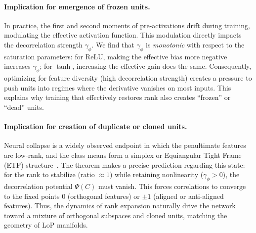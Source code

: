 \documentclass{article}
\newtheorem{theorem}{Theorem}[section]
\numberwithin{figure}{section}
\begin{document}
\paragraph{Implication for emergence of frozen units.}
In practice, the first and second moments of pre-activations drift during training, modulating the effective activation function. This modulation directly impacts the decorrelation strength $\gamma_\phi$. We find that $\gamma_\phi$ is \emph{monotonic} with respect to the saturation parameters: for ReLU, making the effective bias more negative increases $\gamma_\phi$; for $\tanh$, increasing the effective gain does the same. Consequently, optimizing for feature diversity (high decorrelation strength) creates a pressure to push units into regimes where the derivative vanishes on most inputs. This explains why training that effectively restores rank also creates ``frozen'' or ``dead'' units.

\vspace{-7pt}
\paragraph{Implication for creation of duplicate or cloned units.}
Neural collapse is a widely observed endpoint in which the penultimate features are low-rank, and the class means form a simplex or Equiangular Tight Frame (ETF) structure~\citep{papyan2020prevalence}. The theorem makes a precise prediction regarding this state: for the rank to stabilize (ratio $\approx 1$) while retaining nonlinearity ($\gamma_\phi > 0$), the decorrelation potential $\Psi(C)$ must vanish. This forces correlations to converge to the fixed points $0$ (orthogonal features) or $\pm 1$ (aligned or anti-aligned features). Thus, the dynamics of rank expansion naturally drive the network toward a mixture of orthogonal subspaces and cloned units, matching the geometry of LoP manifolds.



\end{document}
